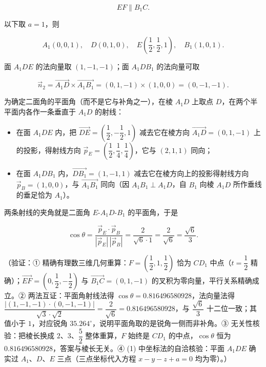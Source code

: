 \begin{answer}
\nopagebreak[4]
\[
EF\parallel B_1C .
\]


以下取 \(a=1\)，则

\nopagebreak[4]
\[
A_1(0,0,1),\quad D(0,1,0),\quad E\left(\dfrac{1}{2},\dfrac{1}{2},1\right),\quad B_1(1,0,1).
\]

面 \(A_1DE\) 的法向量取 \((1,-1,-1)\)；面 \(A_1DB_1\) 的法向量可取

\nopagebreak[4]
\[
\vec{n}_2=\overrightarrow{A_1D}\times\overrightarrow{A_1B_1}=(0,1,-1)\times(1,0,0)=(0,-1,-1).
\]

为确定二面角的平面角（而不是它与补角之一），在棱 \(A_1D\) 上取点 \(D\)，在两个半平面内各作一条垂直于 \(A_1D\) 的射线：

\begin{itemize}
\item 在面 \(A_1DE\) 内，把 \(\overrightarrow{DE}=\left(\dfrac{1}{2},-\dfrac{1}{2},1\right)\) 减去它在棱方向 \(\overrightarrow{A_1D}=(0,1,-1)\) 上的投影，得射线方向 \(\vec{p}_E=\left(\dfrac{1}{2},\dfrac{1}{4},\dfrac{1}{4}\right)\)，它与 \((2,1,1)\) 同向；
\item 在面 \(A_1DB_1\) 内，\(\overrightarrow{DB_1}=(1,-1,1)\) 减去它在棱方向上的投影得射线方向 \(\vec{p}_B=(1,0,0)\)，与 \(\overrightarrow{A_1B_1}\) 同向（因 \(A_1B_1\perp A_1D\)，自 \(B_1\) 向棱 \(A_1D\) 所作垂线的垂足恰为 \(A_1\)）。
\end{itemize}

两条射线的夹角就是二面角 \(E\text{-}A_1D\text{-}B_1\) 的平面角，于是

\nopagebreak[4]
\[
\cos\theta=\dfrac{\vec{p}_E\cdot\vec{p}_B}{|\vec{p}_E|\,|\vec{p}_B|}=\dfrac{2}{\sqrt{6}\cdot 1}=\dfrac{2}{\sqrt{6}}=\dfrac{\sqrt{6}}{3}.
\]

（验证：① 精确有理数三维几何重算：\(F=\left(\dfrac{1}{2},1,\dfrac{1}{2}\right)\) 恰为 \(CD_1\) 中点（\(t=\dfrac{1}{2}\) 精确）；\(\overrightarrow{EF}=\left(0,\dfrac{1}{2},-\dfrac{1}{2}\right)\) 与 \(\overrightarrow{B_1C}=(0,1,-1)\) 的叉积为零向量，平行关系精确成立。② 两法互证：平面角射线法得 \(\cos\theta=0.816496580928\)，法向量法得 \(\dfrac{|(1,-1,-1)\cdot(0,-1,-1)|}{\sqrt{3}\cdot\sqrt{2}}=\dfrac{2}{\sqrt{6}}=0.816496580928\)，与 \(\dfrac{\sqrt{6}}{3}\) 十二位一致；其值小于 \(1\)，对应锐角 \(35.264^\circ\)，说明平面角取的是锐角一侧而非补角。③ 无关性核验：把棱长换成 \(2\)、\(3\)、\(\dfrac{5}{2}\) 整体重算，\(F\) 始终是 \(CD_1\) 的中点，\(\cos\theta\) 恒为 \(0.816496580928\)，答案与棱长无关。④ (1) 中坐标法的自洽核验：平面 \(A_1DE\) 确实过 \(A_1\)、\(D\)、\(E\) 三点（三点坐标代入方程 \(x-y-z+a=0\) 均为零）。）



\end{answer}
